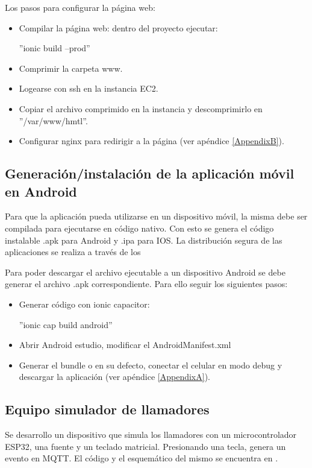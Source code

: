 Los pasos para configurar la página web:
\begin{itemize}
\item Compilar la página web: dentro del proyecto ejecutar:

''ionic build --prod''
\item Comprimir la carpeta www.
\item Logearse con ssh en la instancia EC2.
\item Copiar el archivo comprimido en la instancia y descomprimirlo en ''/var/www/hmtl''.
\item Configurar nginx para redirigir a la página (ver apéndice \ref{AppendixB}).

\end{itemize}

\subsection{Generación/instalación de la aplicación móvil en Android}

Para que la aplicación pueda utilizarse en un dispositivo móvil, la misma debe ser compilada para ejecutarse en código nativo. Con esto se genera el código instalable .apk para Android y .ipa para IOS. La distribución segura de las aplicaciones se realiza a través de los  

Para poder descargar el archivo ejecutable a un dispositivo Android se debe generar el archivo .apk correspondiente. Para ello seguir los siguientes pasos:

\begin{itemize}
\item Generar código con ionic capacitor:

''ionic cap build android''
\item Abrir Android estudio, modificar el AndroidManifest.xml
\item Generar el bundle o en su defecto, conectar el celular en modo debug y descargar la aplicación (ver apéndice \ref{AppendixA}).
\end{itemize}
\pagebreak

\pagebreak
\subsection{Equipo simulador de llamadores}

Se desarrollo un dispositivo que simula los llamadores con un microcontrolador ESP32, una fuente y un teclado matricial. Presionando una tecla, genera un evento en MQTT. El código y el esquemático del mismo se encuentra en \citep{WEBSITE:33}. 

